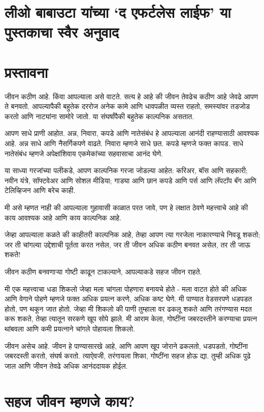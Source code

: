 \chapter*{लीओ बाबाउटा यांच्या `द एफर्टलेस लाईफ' या पुस्तकाचा स्वैर अनुवाद}

\chapter{प्रस्तावना}

जीवन कठीण आहे. किंवा आपल्याला असे वाटते.
सत्य हे आहे की जीवन तेवढेच कठीण आहे जेवढे आपण ते बनवतो.
आपल्यापैकी बहुतेक दररोज अनेक कामे आणि धावपळीत व्यस्त राहतो, समस्यांवर तडजोड करतो आणि नाट्यांना सामोरे जातो. या संघर्षांपैकी बहुतेक काल्पनिक असतात.

आपण साधे प्राणी आहोत. अन्न, निवारा, कपडे आणि नातेसंबंध हे आपल्याला आनंदी राहण्यासाठी आवश्यक आहे. अन्न साधे आणि नैसर्गिकपणे वाढते. निवारा म्हणजे साधे छत. कपडे म्हणजे फक्त कापड. साधे नातेसंबंध म्हणजे अपेक्षांशिवाय एकमेकांच्या सहवासाचा आनंद घेणे.

या साध्या गरजांच्या पलीकडे, आपण काल्पनिक गरजा जोडल्या आहेत: करिअर, बॉस आणि सहकारी; नवीन यंत्रे, सॉफ्टवेअर आणि सोशल मीडिया; गाड्या आणि छान कपडे आणि पर्स आणि लॅपटॉप बॅग आणि टेलिव्हिजन आणि बरेच काही.

मी असे म्हणत नाही की आपल्याला गुहावासी काळात परत जावे, पण हे लक्षात ठेवणे महत्त्वाचे आहे की काय आवश्यक आहे आणि काय काल्पनिक आहे.

जेव्हा आपल्याला कळते की काहीतरी काल्पनिक आहे, तेव्हा आपण त्या गरजेला नाकारण्याचे निवडू शकतो; जर ती चांगल्या उद्देशाची पूर्तता करत नसेल, जर ती जीवन अधिक कठीण बनवत असेल, तर ती जाऊ शकते!

जीवन कठीण बनवणाऱ्या गोष्टी काढून टाकल्याने, आपल्याकडे सहज जीवन राहते.

मी एक महत्त्वाचा धडा शिकलो जेव्हा मला चांगला पोहणारा बनायचे होते - मला वाटत होते की अधिक आणि वेगाने पोहणे म्हणजे फक्त अधिक प्रयत्न करणे, अधिक कष्ट घेणे. मी पाण्यात वेडसरपणे धडपडत होतो, पण थकून जात होतो. जेव्हा मी शिकलो की पाणी तुम्हाला वर ढकलू शकते आणि तरंगण्यास मदत करू शकते, तेव्हा त्यातून सरकणे खूप सोपे झाले. मी आराम केला, गोष्टींना जबरदस्तीने करण्याचा प्रयत्न थांबवला आणि कमी प्रयत्नाने चांगले पोहायला शिकलो.

जीवन असेच आहे. जीवन हे पाण्यासारखे आहे, आणि आपण खूप जोराने ढकलतो, धडपडतो, गोष्टींना जबरदस्ती करतो, संघर्ष करतो. त्याऐवजी, तरंगायला शिका, गोष्टींना सहज होऊ द्या. तुम्ही अधिक पुढे जाल आणि जीवन तेवढे अधिक आनंददायक होईल.

\chapter{ सहज जीवन म्हणजे काय?}

